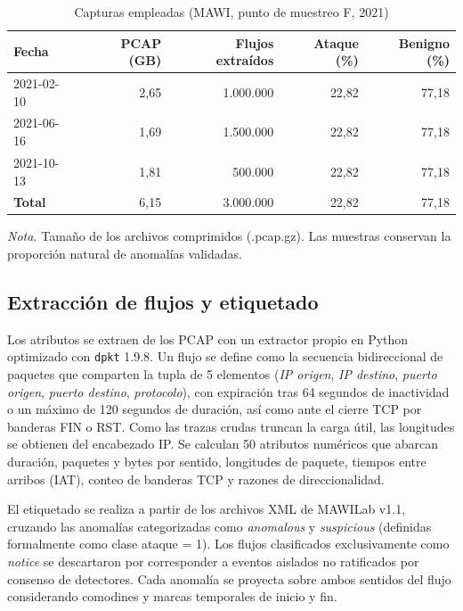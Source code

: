 \documentclass[11pt,a4paper]{article}
\newcommand{\tabfont}{\small\setstretch{1}}
\begin{document}
\begin{table}[ht]
\tabfont
\caption{Capturas empleadas (MAWI, punto de muestreo F, 2021)}
\label{tab:capturas}
\begin{tabular}{@{}lrrrr@{}}
\toprule
Fecha & PCAP (GB) & Flujos extraídos & Ataque (\%) & Benigno (\%) \\
\midrule
2021-02-10 & 2,65 & 1.000.000 & 22,82 & 77,18 \\
2021-06-16 & 1,69 & 1.500.000 & 22,82 & 77,18 \\
2021-10-13 & 1,81 &   500.000 & 22,82 & 77,18 \\
\midrule
\textbf{Total} & 6,15 & 3.000.000 & 22,82 & 77,18 \\
\bottomrule
\end{tabular}

\smallskip
\footnotesize\emph{Nota.} Tamaño de los archivos comprimidos (.pcap.gz). Las muestras conservan la proporción natural de anomalías validadas.
\end{table}

\subsection{Extracción de flujos y etiquetado}
Los atributos se extraen de los PCAP con un extractor propio en Python optimizado con \texttt{dpkt} 1.9.8. Un flujo se define como la secuencia bidireccional de paquetes que comparten la tupla de 5 elementos (\emph{IP origen}, \emph{IP destino}, \emph{puerto origen}, \emph{puerto destino}, \emph{protocolo}), con expiración tras 64 segundos de inactividad o un máximo de 120 segundos de duración, así como ante el cierre TCP por banderas FIN o RST. Como las trazas crudas truncan la carga útil, las longitudes se obtienen del encabezado IP. Se calculan 50 atributos numéricos que abarcan duración, paquetes y bytes por sentido, longitudes de paquete, tiempos entre arribos (IAT), conteo de banderas TCP y razones de direccionalidad.

El etiquetado se realiza a partir de los archivos XML de MAWILab v1.1, cruzando las anomalías categorizadas como \emph{anomalous} y \emph{suspicious} (definidas formalmente como clase ataque = 1). Los flujos clasificados exclusivamente como \emph{notice} se descartaron por corresponder a eventos aislados no ratificados por consenso de detectores. Cada anomalía se proyecta sobre ambos sentidos del flujo considerando comodines y marcas temporales de inicio y fin.
\end{document}
